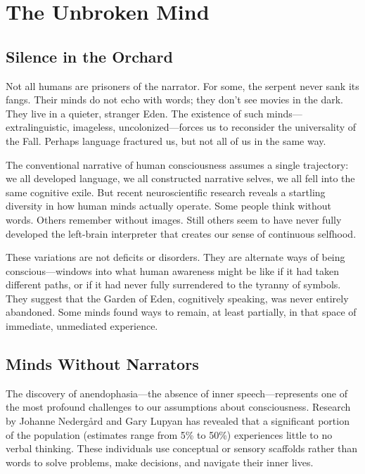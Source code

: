 \chapter{The Unbroken Mind}

\section{Silence in the Orchard}

Not all humans are prisoners of the narrator. For some, the serpent never sank its fangs. Their minds do not echo with words; they don't see movies in the dark. They live in a quieter, stranger Eden. The existence of such minds—extralinguistic, imageless, uncolonized—forces us to reconsider the universality of the Fall. Perhaps language fractured us, but not all of us in the same way.

The conventional narrative of human consciousness assumes a single trajectory: we all developed language, we all constructed narrative selves, we all fell into the same cognitive exile. But recent neuroscientific research reveals a startling diversity in how human minds actually operate. Some people think without words. Others remember without images. Still others seem to have never fully developed the left-brain interpreter that creates our sense of continuous selfhood.

These variations are not deficits or disorders. They are alternate ways of being conscious—windows into what human awareness might be like if it had taken different paths, or if it had never fully surrendered to the tyranny of symbols. They suggest that the Garden of Eden, cognitively speaking, was never entirely abandoned. Some minds found ways to remain, at least partially, in that space of immediate, unmediated experience.

\section{Minds Without Narrators}

The discovery of anendophasia—the absence of inner speech—represents one of the most profound challenges to our assumptions about consciousness. Research by Johanne Nedergård and Gary Lupyan has revealed that a significant portion of the population (estimates range from 5\% to 50\%) experiences little to no verbal thinking. These individuals use conceptual or sensory scaffolds rather than words to solve problems, make decisions, and navigate their inner lives.

